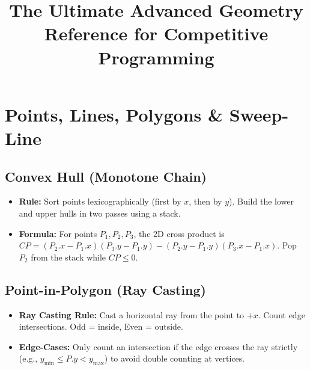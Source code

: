 \documentclass[12pt]{article}
\title{The Ultimate Advanced Geometry Reference for Competitive Programming}
\date{}
\begin{document}
\maketitle
\tableofcontents
\newpage

\section{Points, Lines, Polygons \& Sweep-Line}

\subsection{Convex Hull (Monotone Chain)}
\begin{itemize}
    \item \textbf{Rule:} Sort points lexicographically (first by $x$, then by $y$). Build the lower and upper hulls in two passes using a stack.
    \item \textbf{Formula:} For points $P_1, P_2, P_3$, the 2D cross product is $CP = (P_2.x - P_1.x)(P_3.y - P_1.y) - (P_2.y - P_1.y)(P_3.x - P_1.x)$. Pop $P_2$ from the stack while $CP \le 0$.
\end{itemize}

\begin{center}
\end{center}

\subsection{Point-in-Polygon (Ray Casting)}
\begin{itemize}
    \item \textbf{Ray Casting Rule:} Cast a horizontal ray from the point to $+x$. Count edge intersections. Odd = inside, Even = outside.
    \item \textbf{Edge-Cases:} Only count an intersection if the edge crosses the ray strictly (e.g., $y_{\min} \le P.y < y_{\max}$) to avoid double counting at vertices.
\end{itemize}
\end{document}
